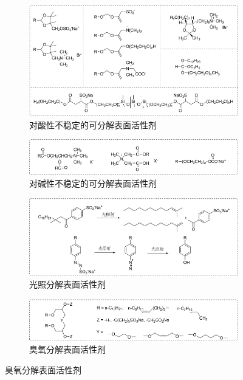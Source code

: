 \documentclass[bachelor,adobefonts]{jnuthesis} %
\begin{document}
    \begin{figure}
        \centering
        \begin{subfigure}[b]{\textwidth}
            \centering
            \includegraphics[width=\textwidth]{Figure/cleavable-a.pdf}
            \caption{对酸性不稳定的可分解表面活性剂}\label{fig:cleavable-a}
        \end{subfigure}%
    
        \begin{subfigure}[b]{\textwidth}
            \centering
            \includegraphics[width=\textwidth]{Figure/cleavable-b.pdf}
            \caption{对碱性不稳定的可分解表面活性剂}\label{fig:cleavable-b}
        \end{subfigure}
    
        \begin{subfigure}[b]{\textwidth}
            \centering
            \includegraphics[width=\textwidth]{Figure/cleavable-c.pdf}
            \caption{光照分解表面活性剂}\label{fig:cleavable-c}
        \end{subfigure}%

        \begin{subfigure}[b]{\textwidth}
            \centering
            \includegraphics[width=\textwidth]{Figure/cleavable-d.pdf}
            \caption{臭氧分解表面活性剂}\label{fig:cleavable-d}
        \end{subfigure}
    \end{figure}
\end{document}
